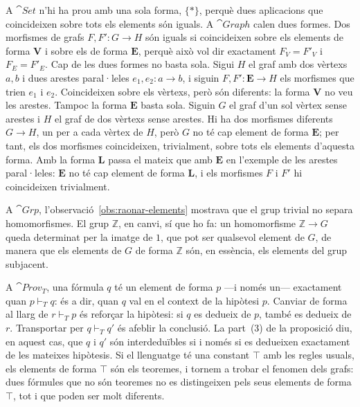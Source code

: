 \begin{exemple}
A $\cat{Set}$ n'hi ha prou amb una sola forma, $\{\ast\}$, perquè dues aplicacions que coincideixen sobre tots els elements són iguals. A $\cat{Graph}$ calen dues formes. Dos morfismes de grafs $F,F'\colon G\to H$ són iguals si coincideixen sobre els elements de forma $\mathbf V$ i sobre els de forma $\mathbf E$, perquè això vol dir exactament $F_V=F'_V$ i $F_E=F'_E$. Cap de les dues formes no basta sola. Sigui $H$ el graf amb dos vèrtexs $a,b$ i dues arestes paral·leles $e_1,e_2\colon a\to b$, i siguin $F,F'\colon\mathbf E\to H$ els morfismes que trien $e_1$ i $e_2$. Coincideixen sobre els vèrtexs, però són diferents: la forma $\mathbf V$ no veu les arestes. Tampoc la forma $\mathbf E$ basta sola. Siguin $G$ el graf d'un sol vèrtex sense arestes i $H$ el graf de dos vèrtexs sense arestes. Hi ha dos morfismes diferents $G\to H$, un per a cada vèrtex de $H$, però $G$ no té cap element de forma $\mathbf E$; per tant, els dos morfismes coincideixen, trivialment, sobre tots els elements d'aquesta forma. Amb la forma $\mathbf L$ passa el mateix que amb $\mathbf E$ en l'exemple de les arestes paral·leles: $\mathbf E$ no té cap element de forma $\mathbf L$, i els morfismes $F$ i $F'$ hi coincideixen trivialment.

A $\cat{Grp}$, l'observació~\ref{obs:raonar-elements} mostrava que el grup trivial no separa homomorfismes. El grup $\mathbb Z$, en canvi, sí que ho fa: un homomorfisme $\mathbb Z\to G$ queda determinat per la imatge de $1$, que pot ser qualsevol element de $G$, de manera que els elements de $G$ de forma $\mathbb Z$ són, en essència, els elements del grup subjacent.
\end{exemple}

\begin{exemple}
A $\cat{Prov}_T$, una fórmula $q$ té un element de forma $p$ ---i només un--- exactament quan $p\vdash_T q$: és a dir, quan $q$ val en el context de la hipòtesi $p$. Canviar de forma al llarg de $r\vdash_T p$ és reforçar la hipòtesi: si $q$ es dedueix de $p$, també es dedueix de $r$. Transportar per $q\vdash_T q'$ és afeblir la conclusió. La part~(3) de la proposició diu, en aquest cas, que $q$ i $q'$ són interdeduïbles si i només si es dedueixen exactament de les mateixes hipòtesis. Si el llenguatge té una constant $\top$ amb les regles usuals, els elements de forma $\top$ són els teoremes, i tornem a trobar el fenomen dels grafs: dues fórmules que no són teoremes no es distingeixen pels seus elements de forma $\top$, tot i que poden ser molt diferents.
\end{exemple}

